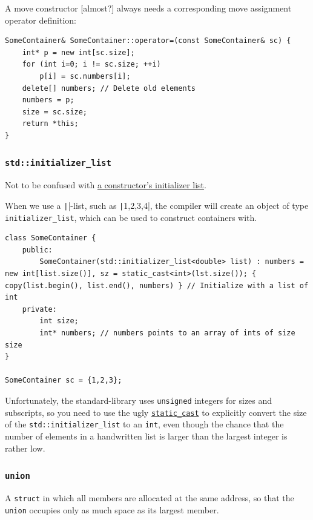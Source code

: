 \documentclass[table, xcdraw]{article}%
\begin{document}
A move constructor [almost?] always needs a corresponding move assignment operator definition:

\begin{verbatim}
SomeContainer& SomeContainer::operator=(const SomeContainer& sc) {
    int* p = new int[sc.size];
    for (int i=0; i != sc.size; ++i)
        p[i] = sc.numbers[i];
    delete[] numbers; // Delete old elements
    numbers = p;
    size = sc.size;
    return *this;
}
\end{verbatim}

\subsubsection{\texttt{std::initializer_list}} \label{stdinitializerlist}

Not to be confused with \hyperref[initializerlist]{a constructor's initializer list}.

When we use a \texttt|{}|-list, such as \texttt|{1,2,3,4}|, the compiler will create an object of type \texttt{initializer_list}, which can be used to construct containers with.

\begin{verbatim}
class SomeContainer {
    public:
        SomeContainer(std::initializer_list<double> list) : numbers = new int[list.size()], sz = static_cast<int>(lst.size()); { copy(list.begin(), list.end(), numbers) } // Initialize with a list of int
    private:
        int size;
        int* numbers; // numbers points to an array of ints of size size
}

SomeContainer sc = {1,2,3};
\end{verbatim}

Unfortunately, the standard-library uses \texttt{unsigned} integers for sizes and subscripts, so you need to use the ugly \hyperref[staticcast]{\texttt{static_cast}} to explicitly convert the size of the \texttt{std::initializer_list} to an \texttt{int}, even though the chance that the number of elements in a handwritten list is larger than the largest integer is rather low. 

\subsubsection{\texttt{union}}
A \texttt{struct} in which all members are allocated at the same address, so that the \texttt{union} occupies only as much space as its largest member.
\end{document}
